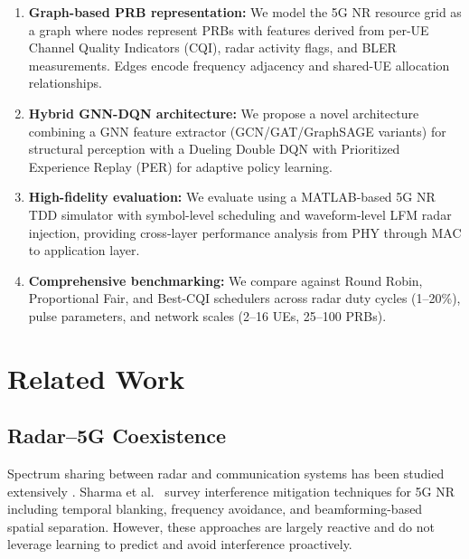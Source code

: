 \documentclass[conference]{IEEEtran}
\begin{document}
\begin{enumerate}
    \item \textbf{Graph-based PRB representation:} We model the 5G NR resource grid as a graph where nodes represent PRBs with features derived from per-UE Channel Quality Indicators (CQI), radar activity flags, and BLER measurements. Edges encode frequency adjacency and shared-UE allocation relationships.

    \item \textbf{Hybrid GNN-DQN architecture:} We propose a novel architecture combining a GNN feature extractor (GCN/GAT/GraphSAGE variants) for structural perception with a Dueling Double DQN with Prioritized Experience Replay (PER) for adaptive policy learning.

    \item \textbf{High-fidelity evaluation:} We evaluate using a MATLAB-based 5G NR TDD simulator with symbol-level scheduling and waveform-level LFM radar injection, providing cross-layer performance analysis from PHY through MAC to application layer.

    \item \textbf{Comprehensive benchmarking:} We compare against Round Robin, Proportional Fair, and Best-CQI schedulers across radar duty cycles (1--20\%), pulse parameters, and network scales (2--16 UEs, 25--100 PRBs).
\end{enumerate}

\section{Related Work}

\subsection{Radar--5G Coexistence}

Spectrum sharing between radar and communication systems has been studied extensively \cite{labib2017coexistence, liu2020joint, zheng2019spectrum}. Sharma et al.\ \cite{sharma2020radar5g} survey interference mitigation techniques for 5G NR including temporal blanking, frequency avoidance, and beamforming-based spatial separation. However, these approaches are largely reactive and do not leverage learning to predict and avoid interference proactively.
\end{document}
